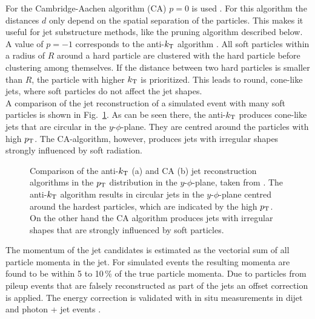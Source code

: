 \noindent For the Cambridge-Aachen algorithm (CA) $p=0$ is used \cite{CAalgo}. For this algorithm the distances $d$ only depend on the spatial separation of the particles. This makes it useful for jet substructure methods, like the pruning algorithm described below.\\

\noindent A value of $p=-1$ corresponds to the anti-$k_{\rm T}$ algorithm \cite{antikt}. All soft particles within a radius of $R$ around a hard particle are clustered with the hard particle before clustering among themselves. If the distance between two hard particles is smaller than $R$, the particle with higher $k_{\rm T}$ is prioritized. This leads to round, cone-like jets, where soft particles do not affect the jet shapes.\\

\noindent A comparison of the jet reconstruction of a simulated event with many soft particles is shown in Fig.~\ref{fig:eventreco:jet_reco}. As can be seen there, the anti-$k_{\rm T}$ produces cone-like jets that are circular in the $y$-$\phi$-plane. They are centred around the particles with high $p_{\rm T}$. The CA-algorithm, however, produces jets with irregular shapes strongly influenced by soft radiation.\\
\begin{figure}
	\begin{minipage}{0.5\textwidth}
	\end{minipage}%
	\begin{minipage}{0.5\textwidth}
	\end{minipage}
	\caption[Comparison of the anti-$k_{\rm T}$ and CA jet reconstruction algorithms]{Comparison of the anti-$k_{\rm T}$ (a) and CA (b) jet reconstruction algorithms in the $p_{\rm T}$ distribution in the $y$-$\phi$-plane, taken from \cite{antikt}. The anti-$k_{\rm T}$ algorithm results in circular jets in the $y$-$\phi$-plane centred around the hardest particles, which are indicated by the high $p_{\rm T}$. On the other hand the CA algorithm produces jets with irregular shapes that are strongly influenced by soft particles.}
	\label{fig:eventreco:jet_reco}
\end{figure}

\noindent The momentum of the jet candidates is estimated as the vectorial sum of all particle momenta in the jet. For simulated events the resulting momenta are found to be within 5 to 10\,\% of the true particle momenta. Due to particles from pileup events that are falsely reconstructed as part of the jets an offset correction is applied. The energy correction is validated with in situ measurements in dijet and photon + jet events \cite{jetcorrection}.\\

